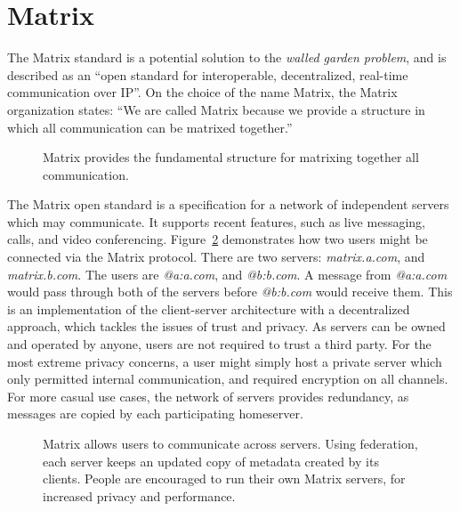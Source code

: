 \section{Matrix}
The Matrix standard is a potential solution to the \textit{walled garden problem}, and is described as an ``open standard for interoperable, decentralized, real-time communication over IP''\cite{matrix_org}.
On the choice of the name Matrix, the Matrix organization states: ``We are called Matrix because we provide a structure in which all communication can be matrixed together.''\cite{matrix_org_faq}

\begin{figure}
	\centering
	\caption{
		Matrix provides the fundamental structure for matrixing together all communication.
	}\label{fig:matrixing_together}
\end{figure}

The Matrix open standard\cite{matrix_org_spec} is a specification for a network of independent servers which may communicate.
It supports recent features, such as live messaging, calls, and video conferencing.
Figure~\ref{fig:matrix_structure} demonstrates how two users might be connected via the Matrix protocol.
There are two servers: \textit{matrix.a.com}, and \textit{matrix.b.com}.
The users are \textit{@a:a.com}, and \textit{@b:b.com}.
A message from \textit{@a:a.com} would pass through both of the servers before \textit{@b:b.com} would receive them.
This is an implementation of the client-server architecture with a decentralized approach, which tackles the issues of trust and privacy.
As servers can be owned and operated by anyone, users are not required to trust a third party.
For the most extreme privacy concerns, a user might simply host a private server which only permitted internal communication, and required encryption on all channels.
For more casual use cases, the network of servers provides redundancy, as messages are copied by each participating homeserver.

\begin{figure}
	\centering
	\resizebox{!}{!}{}
	\caption{
		Matrix allows users to communicate across servers.
		Using federation, each server keeps an updated copy of metadata created by its clients.
		People are encouraged to run their own Matrix servers, for increased privacy and performance.
	}\label{fig:matrix_structure}
\end{figure}

